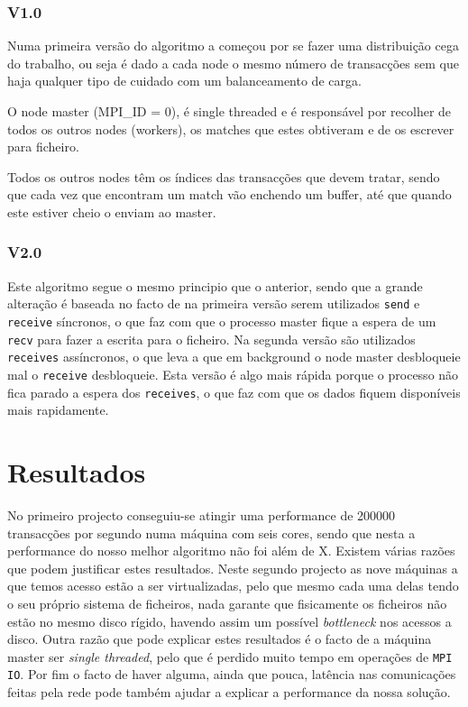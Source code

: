 \documentclass[a4paper]{article}
\begin{document}
\subsubsection{V1.0}
\indent \indent Numa primeira versão do algoritmo a começou por se fazer uma distribuição cega do trabalho, ou seja é dado a cada node o mesmo número de transacções sem que haja qualquer tipo de cuidado com um balanceamento de carga.

O node master (MPI\_ID = 0), é single threaded e é responsável por recolher de todos os outros nodes (workers), os matches que estes obtiveram e de os escrever para ficheiro.

Todos os outros nodes têm os índices das transacções que devem tratar, sendo que cada vez que encontram um match vão enchendo um buffer, até que quando este estiver cheio o enviam ao master. 
\subsubsection{V2.0}
\indent \indent Este algoritmo segue o mesmo principio que o anterior, sendo que a grande alteração é baseada no facto de na primeira versão serem utilizados \texttt{send} e \texttt{receive} síncronos, o que faz com que o processo master fique a espera de um \texttt{recv} para fazer a escrita para o ficheiro. Na segunda versão são utilizados \texttt{receives} assíncronos, o que leva a que em background o node master desbloqueie mal o \texttt{receive} desbloqueie. Esta versão é algo mais rápida porque o processo não fica parado a espera dos \texttt{receives}, o que faz com que os dados fiquem disponíveis mais rapidamente.
\clearpage


\section{Resultados}
\indent \indent No primeiro projecto conseguiu-se atingir uma performance de 200000 transacções por segundo numa máquina com seis cores, sendo que nesta a performance do nosso melhor algoritmo não foi além de X. Existem várias razões que podem justificar estes resultados. Neste segundo projecto as nove máquinas a que temos acesso estão a ser virtualizadas, pelo que mesmo cada uma delas tendo o seu próprio sistema de ficheiros, nada garante que fisicamente os ficheiros não estão no mesmo disco rígido, havendo assim um possível \textit{bottleneck} nos acessos a disco. Outra razão que pode explicar estes resultados é o facto de a máquina master ser \textit{single threaded}, pelo que é perdido muito tempo em operações de \texttt{MPI IO}. Por fim o facto de haver alguma, ainda que pouca, latência nas comunicações feitas pela rede pode também ajudar a explicar a performance da nossa solução.
\end{document}
